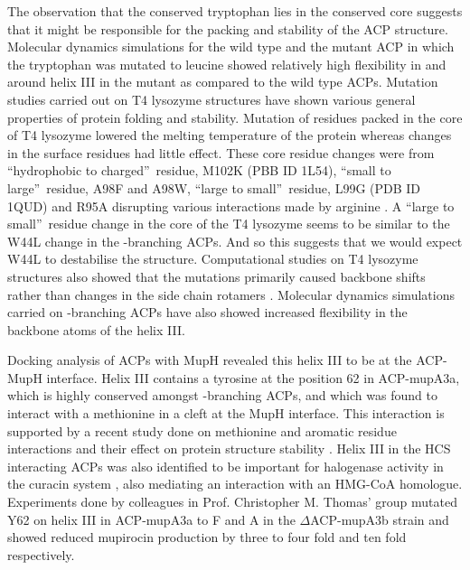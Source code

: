 The observation that the conserved tryptophan lies in the conserved core suggests that it might be responsible for the packing and stability of the ACP structure. Molecular dynamics simulations for the wild type and the mutant ACP in which the tryptophan was mutated to leucine showed relatively high flexibility in and around helix III in the mutant as compared to the wild type ACPs. Mutation studies carried out on T4 lysozyme structures have shown various general properties of protein folding and stability. Mutation of residues packed in the core of T4 lysozyme lowered the melting temperature of the protein whereas changes in the surface residues had little effect. These core residue changes were from \textquotedblleft hydrophobic to charged\textquotedblright \ residue, M102K (PBB ID 1L54), \textquotedblleft small to large\textquotedblright \ residue, A98F and A98W, \textquotedblleft large to small\textquotedblright \ residue, L99G (PDB ID 1QUD) and R95A disrupting various interactions made by arginine \parencite{Rennell1991, Tokuriki2009}. A \textquotedblleft large to small\textquotedblright \ residue change in the core of the T4 lysozyme seems to be similar to the W44L change in the \bet-branching ACPs. And so this suggests that we would expect W44L to destabilise the structure. Computational studies on T4 lysozyme structures also showed that the mutations primarily caused backbone shifts rather than changes in the side chain rotamers \parencite{Hurley1992, Dahiyat1997, Mooers2003}. Molecular dynamics simulations carried on \bet-branching ACPs have also showed increased flexibility in the backbone atoms of the helix III. %

Docking analysis of ACPs with MupH revealed this helix III to be at the ACP-MupH interface. Helix III contains a tyrosine at the position 62 in ACP-mupA3a, which is highly conserved amongst \bet-branching ACPs, and which was found to interact with a methionine in a cleft at the MupH interface. This interaction is supported by a recent study done on methionine and aromatic residue interactions and their effect on protein structure stability \parencite{Valley2012}. Helix III in the HCS interacting ACPs was also identified to be important for halogenase activity in the curacin system \parencite{Busche2012}, also mediating an interaction with an HMG-CoA homologue. Experiments done by colleagues in Prof. Christopher M. Thomas' group mutated Y62 on helix III in ACP-mupA3a to F and A in the $\Delta$ACP-mupA3b strain and showed reduced mupirocin production  by three to four fold and ten fold respectively.  

